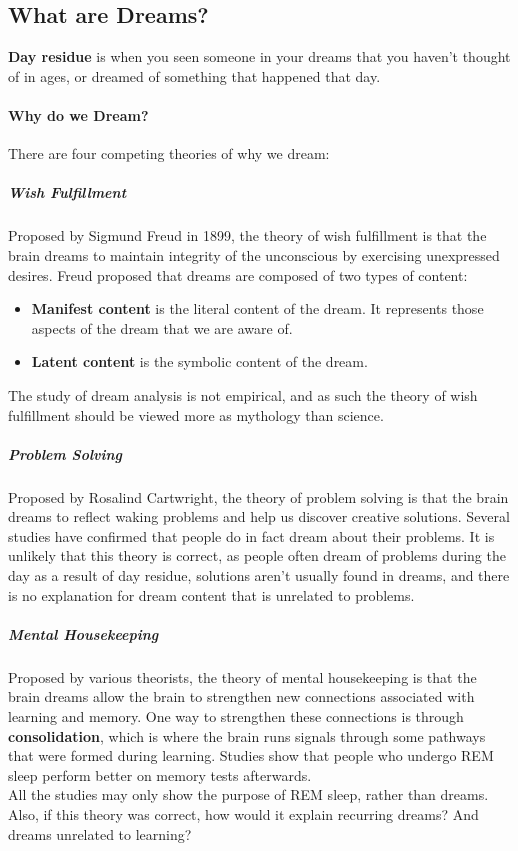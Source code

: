 \documentclass[10pt,letter]{article}
\theoremstyle{plain}
\theoremstyle{definition}
\begin{document}
\subsection*{What are Dreams?}
\textbf{Day residue} is when you seen someone in your dreams that you haven't thought of in ages, or dreamed of something that happened that day.  
\paragraph{Why do we Dream?}
There are four competing theories of why we dream: 
\subparagraph{Wish Fulfillment}
Proposed by Sigmund Freud in 1899, the theory of wish fulfillment is that the brain dreams to maintain integrity of the unconscious by exercising unexpressed desires. Freud proposed that dreams are composed of two types of content: \begin{itemize}
    \item \textbf{Manifest content} is the literal content of the dream. It represents those aspects of the dream that we are aware of. 
    \item \textbf{Latent content} is the symbolic content of the dream. 
\end{itemize}
The study of dream analysis is not empirical, and as such the theory of wish fulfillment should be viewed more as mythology than science. 

\subparagraph{Problem Solving}
Proposed by Rosalind Cartwright, the theory of problem solving is that the brain dreams to reflect waking problems and help us discover creative solutions. Several studies have confirmed that people do in fact dream about their problems. It is unlikely that this theory is correct, as people often dream of problems during the day as a result of day residue, solutions aren't usually found in dreams, and there is no explanation for dream content that is unrelated to problems. 

\subparagraph{Mental Housekeeping}
Proposed by various theorists, the theory of mental housekeeping is that the brain dreams allow the brain to strengthen new connections associated with learning and memory. One way to strengthen these connections is through \textbf{consolidation}, which is where the brain runs signals through some pathways that were formed during learning. Studies show that people who undergo REM sleep perform better on memory tests afterwards. \\ 
All the studies may only show the purpose of REM sleep, rather than dreams. Also, if this theory was correct, how would it explain recurring dreams? And dreams unrelated to learning? 
\end{document}
